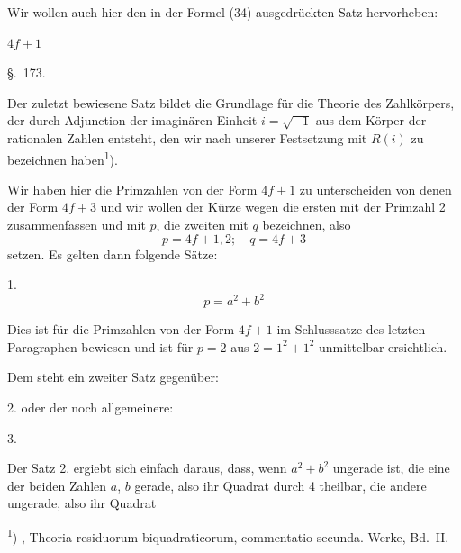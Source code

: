 
Wir wollen auch hier den in der Formel (34) ausgedrückten
Satz hervorheben:

 $4f+1$ 

\begin{center}
\S.~173.\\[6pt]
\end{center}

Der zuletzt bewiesene Satz bildet die Grundlage für die
Theorie des Zahlkörpers, der durch Adjunction der imaginären
Einheit $i=\sqrt{-1}$ aus dem Körper der rationalen Zahlen entsteht,
den wir nach unserer Festsetzung mit $R(i)$ zu bezeichnen
haben\textsuperscript{1}).

Wir haben hier die Primzahlen von der Form $4f+1$ zu
unterscheiden von denen der Form $4f+3$ und wir wollen der
Kürze wegen die ersten mit der Primzahl 2 zusammenfassen und
mit $p$, die zweiten mit $q$ bezeichnen, also
\[
p=4f+1,2;\quad q=4f+3
\]
setzen. Es gelten dann folgende Sätze:

1. 
\[
p=a^2+b^2
\]

Dies ist für die Primzahlen von der Form $4f+1$ im Schlusssatze
 des letzten Paragraphen bewiesen und ist für $p=2$ aus
$2=1^2+1^2$ unmittelbar ersichtlich.

Dem steht ein zweiter Satz gegenüber:

2.  oder der noch allgemeinere:

3. 

Der Satz 2. ergiebt sich einfach daraus, dass, wenn $a^2+b^2$
ungerade ist, die eine der beiden Zahlen $a$, $b$ gerade, also ihr
Quadrat durch 4 theilbar, die andere ungerade, also ihr Quadrat

\textsuperscript{1}) , Theoria residuorum biquadraticorum, commentatio
secunda. Werke, Bd.~II.
